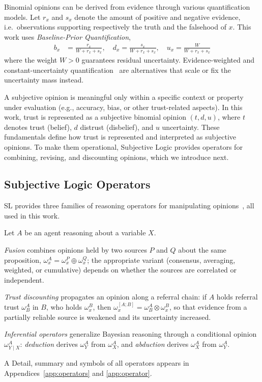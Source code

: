 Binomial opinions can be derived from evidence through various quantification models. Let $r_x$ and $s_x$ denote the amount of positive and negative evidence, i.e.\ observations supporting respectively the truth and the falsehood of $x$. This work uses \emph{Baseline-Prior Quantification},
\begin{align}
b_x &= \frac{r_x}{W + r_x + s_x}, \quad
d_x = \frac{s_x}{W + r_x + s_x}, \quad
u_x = \frac{W}{W + r_x + s_x}
\label{eq:q1}
\end{align}
where the weight \(W>0\) guarantees residual uncertainty. Evidence-weighted and constant-uncertainty quantification~\cite{10.1007/978-3-032-19096-3_17} are alternatives that scale or fix the uncertainty mass instead.

A subjective opinion is meaningful only within a specific context or property under evaluation (e.g., accuracy, bias, or other trust-related aspects). In this work, trust is represented as a subjective binomial opinion $(t, d, u)$, where $t$ denotes trust (belief), $d$ distrust (disbelief), and $u$ uncertainty. These fundamentals define how trust is represented and interpreted as subjective opinions. To make them operational, Subjective Logic provides operators for combining, revising, and discounting opinions, which we introduce next.

\vspace{-0.5em}
\subsection{Subjective Logic Operators}\label{sec:backslop}

SL provides three families of reasoning operators for manipulating opinions~\cite{8009820,10706345,josang2016subjective}, all used in this work.

\begin{definition}[SL Operators]\label{def:fusion}
Let \(A\) be an agent reasoning about a variable \(X\).

\emph{Fusion} combines opinions held by two sources \(P\) and \(Q\) about the same proposition, \(\omega^A_{x} = \omega^P_{x} \oplus \omega^Q_{x}\); the appropriate variant (consensus, averaging, weighted, or cumulative) depends on whether the sources are correlated or independent.

\emph{Trust discounting} propagates an opinion along a referral chain: if \(A\) holds referral trust \(\omega^A_B\) in \(B\), who holds \(\omega^B_x\), then \(\omega^{[A;B]}_{x} = \omega^A_B \otimes \omega^B_{x}\), so that evidence from a partially reliable source is weakened and its uncertainty increased.

\emph{Inferential operators} generalize Bayesian reasoning through a conditional opinion \(\omega^A_{Y \mid X}\): \emph{deduction} derives \(\omega^A_Y\) from \(\omega^A_X\), and \emph{abduction} derives \(\omega^A_X\) from \(\omega^A_Y\).
\end{definition}
\noindent A Detail, summary and symbols of all operators appears in Appendices~\ref{app:operators} and \ref{app:operator}.


